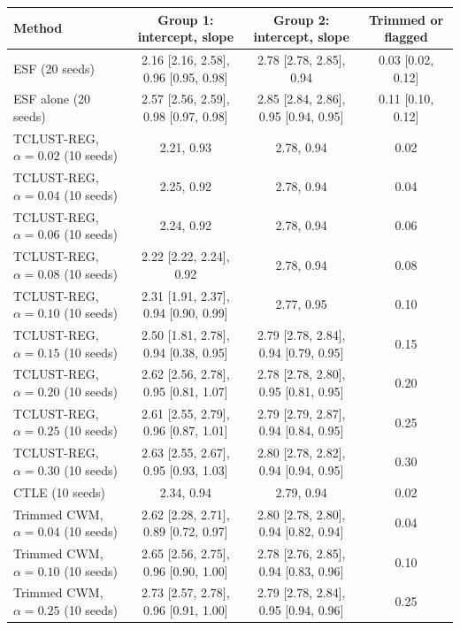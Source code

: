 \begin{tabular}{lccc}
\toprule
Method & Group 1: intercept, slope & Group 2: intercept, slope & Trimmed or flagged \\
\midrule
ESF (20 seeds) & 2.16 [2.16, 2.58], 0.96 [0.95, 0.98] & 2.78 [2.78, 2.85], 0.94 & 0.03 [0.02, 0.12] \\
ESF alone (20 seeds) & 2.57 [2.56, 2.59], 0.98 [0.97, 0.98] & 2.85 [2.84, 2.86], 0.95 [0.94, 0.95] & 0.11 [0.10, 0.12] \\
TCLUST-REG, $\alpha=0.02$ (10 seeds) & 2.21, 0.93 & 2.78, 0.94 & 0.02 \\
TCLUST-REG, $\alpha=0.04$ (10 seeds) & 2.25, 0.92 & 2.78, 0.94 & 0.04 \\
TCLUST-REG, $\alpha=0.06$ (10 seeds) & 2.24, 0.92 & 2.78, 0.94 & 0.06 \\
TCLUST-REG, $\alpha=0.08$ (10 seeds) & 2.22 [2.22, 2.24], 0.92 & 2.78, 0.94 & 0.08 \\
TCLUST-REG, $\alpha=0.10$ (10 seeds) & 2.31 [1.91, 2.37], 0.94 [0.90, 0.99] & 2.77, 0.95 & 0.10 \\
TCLUST-REG, $\alpha=0.15$ (10 seeds) & 2.50 [1.81, 2.78], 0.94 [0.38, 0.95] & 2.79 [2.78, 2.84], 0.94 [0.79, 0.95] & 0.15 \\
TCLUST-REG, $\alpha=0.20$ (10 seeds) & 2.62 [2.56, 2.78], 0.95 [0.81, 1.07] & 2.78 [2.78, 2.80], 0.95 [0.81, 0.95] & 0.20 \\
TCLUST-REG, $\alpha=0.25$ (10 seeds) & 2.61 [2.55, 2.79], 0.96 [0.87, 1.01] & 2.79 [2.79, 2.87], 0.94 [0.84, 0.95] & 0.25 \\
TCLUST-REG, $\alpha=0.30$ (10 seeds) & 2.63 [2.55, 2.67], 0.95 [0.93, 1.03] & 2.80 [2.78, 2.82], 0.94 [0.94, 0.95] & 0.30 \\
CTLE (10 seeds) & 2.34, 0.94 & 2.79, 0.94 & 0.02 \\
Trimmed CWM, $\alpha=0.04$ (10 seeds) & 2.62 [2.28, 2.71], 0.89 [0.72, 0.97] & 2.80 [2.78, 2.80], 0.94 [0.82, 0.94] & 0.04 \\
Trimmed CWM, $\alpha=0.10$ (10 seeds) & 2.65 [2.56, 2.75], 0.96 [0.90, 1.00] & 2.78 [2.76, 2.85], 0.94 [0.83, 0.96] & 0.10 \\
Trimmed CWM, $\alpha=0.25$ (10 seeds) & 2.73 [2.57, 2.78], 0.96 [0.91, 1.00] & 2.79 [2.78, 2.84], 0.95 [0.94, 0.96] & 0.25 \\
\bottomrule
\end{tabular}